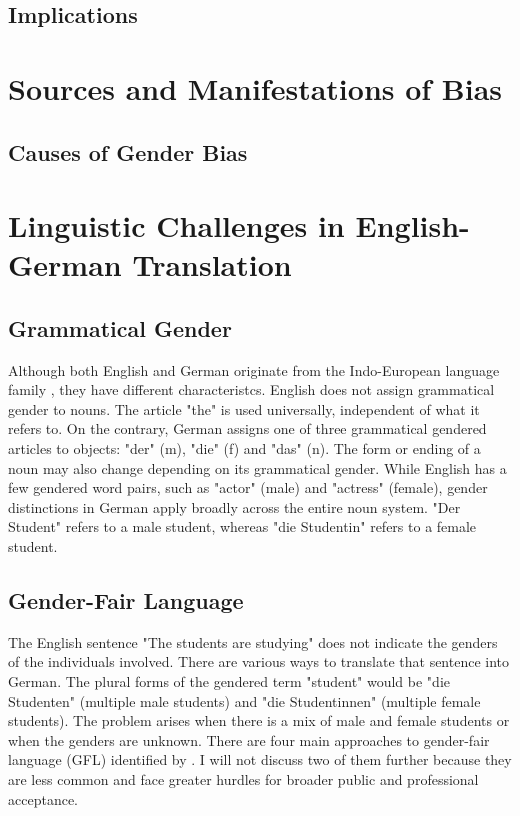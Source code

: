 \subsection{Implications}


\section{Sources and Manifestations of Bias}
\subsection{Causes of Gender Bias}



\section{Linguistic Challenges in English-German Translation}

\subsection{Grammatical Gender}
Although both English and German originate from the Indo-European language family \citep{baldiEnglishIndoEuropeanLanguage2008}, they have different characteristcs. English does not assign grammatical gender to nouns. The article "the" is used universally, independent of what it refers to. On the contrary, German assigns one of three grammatical gendered articles to objects: "der" (m), "die" (f) and "das" (n). The form or ending of a noun may also change depending on its grammatical gender. While English has a few gendered word pairs, such as "actor" (male) and "actress" (female), gender distinctions in German apply broadly across the entire noun system. "Der Student" refers to a male student, whereas "die Studentin" refers to a female student.

\subsection{Gender-Fair Language}
The English sentence "The students are studying" does not indicate the genders of the individuals involved. There are various ways to translate that sentence into German. The plural forms of the gendered term "student" would be "die Studenten" (multiple male students) and "die Studentinnen" (multiple female students). The problem arises when there is a mix of male and female students or when the genders are unknown. There are four main approaches to gender-fair language (GFL) identified by \citet{lardelliBuildingBridgesDataset2024}. I will not discuss two of them further because they are less common and face greater hurdles for broader public and professional acceptance.

